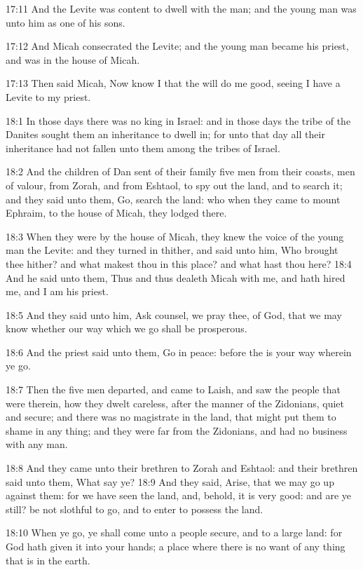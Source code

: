 17:11 And the Levite was content to dwell with the man; and the young
man was unto him as one of his sons.

17:12 And Micah consecrated the Levite; and the young man became his
priest, and was in the house of Micah.

17:13 Then said Micah, Now know I that the \LORD will do me good,
seeing I have a Levite to my priest.

18:1 In those days there was no king in Israel: and in those days the
tribe of the Danites sought them an inheritance to dwell in; for unto
that day all their inheritance had not fallen unto them among the
tribes of Israel.

18:2 And the children of Dan sent of their family five men from their
coasts, men of valour, from Zorah, and from Eshtaol, to spy out the
land, and to search it; and they said unto them, Go, search the land:
who when they came to mount Ephraim, to the house of Micah, they
lodged there.

18:3 When they were by the house of Micah, they knew the voice of the
young man the Levite: and they turned in thither, and said unto him,
Who brought thee hither? and what makest thou in this place? and what
hast thou here?  18:4 And he said unto them, Thus and thus dealeth
Micah with me, and hath hired me, and I am his priest.

18:5 And they said unto him, Ask counsel, we pray thee, of God, that
we may know whether our way which we go shall be prosperous.

18:6 And the priest said unto them, Go in peace: before the \LORD is
your way wherein ye go.

18:7 Then the five men departed, and came to Laish, and saw the people
that were therein, how they dwelt careless, after the manner of the
Zidonians, quiet and secure; and there was no magistrate in the land,
that might put them to shame in any thing; and they were far from the
Zidonians, and had no business with any man.

18:8 And they came unto their brethren to Zorah and Eshtaol: and their
brethren said unto them, What say ye?  18:9 And they said, Arise, that
we may go up against them: for we have seen the land, and, behold, it
is very good: and are ye still? be not slothful to go, and to enter to
possess the land.

18:10 When ye go, ye shall come unto a people secure, and to a large
land: for God hath given it into your hands; a place where there is no
want of any thing that is in the earth.


